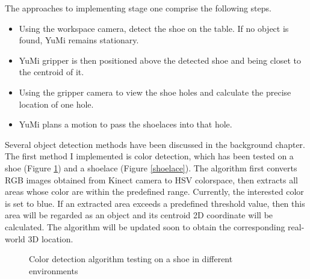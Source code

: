 The approaches to implementing stage one comprise the following steps.
\begin{itemize}
 \item Using the workspace camera, detect the shoe on the table. If no object is found, YuMi remains stationary.
 \item YuMi gripper is then positioned above the detected shoe and being closet to the centroid of it. 
 \item Using the gripper camera to view the shoe holes and calculate the precise location of one hole.
 \item YuMi plans a motion to pass the shoelaces into that hole.
\end{itemize}

Several object detection methods have been discussed in the background chapter. The first method I implemented is color detection, which has been tested on a shoe (Figure \ref{shoe}) and a shoelace (Figure \ref{shoelace}). The algorithm first converts RGB images obtained from Kinect camera to HSV colorspace, then extracts all areas whose color are within the predefined range. Currently, the interested color is set to blue. If an extracted area exceeds a predefined threshold value, then this area will be regarded as an object and its centroid 2D coordinate will be calculated. The algorithm will be updated soon to obtain the corresponding real-world 3D location. 
\begin{figure}[H]
\centering
%
%
%
\caption{Color detection algorithm testing on a shoe in different environments}%
\label{shoe}%
\end{figure}
